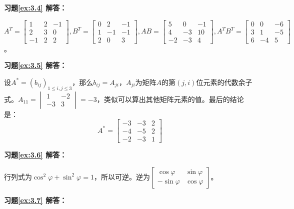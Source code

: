 \vspace{1.5em}

\textbf{习题\ref{ex:3.4} 解答：}

$A^T = \begin{bmatrix} 1 & 2 & -1 \\ 2 & 3 & 0 \\ -1 & 2 & 2 \end{bmatrix}, B^T = \begin{bmatrix} 0 & 2 & -1 \\ 1 & -1 & -1 \\ 2 & 0 & 3 \end{bmatrix}, AB = \begin{bmatrix} 5 & 0 & -1 \\ 4  & -3 & 10 \\ -2 & -3 & 4 \end{bmatrix}, A^TB^T = \begin{bmatrix} 0 & 0 & -6 \\ 3 & 1 & -5 \\ 6 & -4 & 5 \end{bmatrix}$。

\vspace{1.5em}

\textbf{习题\ref{ex:3.5} 解答：}

设$A^{\ast} = (b_{ij})_{1 \leqslant i,j \leqslant 3}$，那么$b_{ij} = A_{ji}$，$A_{ji}$为矩阵$A$的第$(j,i)$位元素的代数余子式。$A_{11} = \begin{vmatrix} 1 & -2 \\ -3 & 3 \end{vmatrix} = -3$，类似可以算出其他矩阵元素的值。最后的结论是：
$$A^{\ast} = \begin{bmatrix} -3 & -3 & 2 \\ -4 & -5 & 2 \\ -2 & -3 & 1 \end{bmatrix}$$

\vspace{1.5em}

\textbf{习题\ref{ex:3.6} 解答：}

行列式为$\cos^2\varphi + \sin^2\varphi = 1$，所以可逆。逆为$\begin{bmatrix} \cos\varphi & \sin\varphi \\ -\sin\varphi & \cos\varphi \end{bmatrix}$。

\vspace{1.5em}

\textbf{习题\ref{ex:3.7} 解答：}

